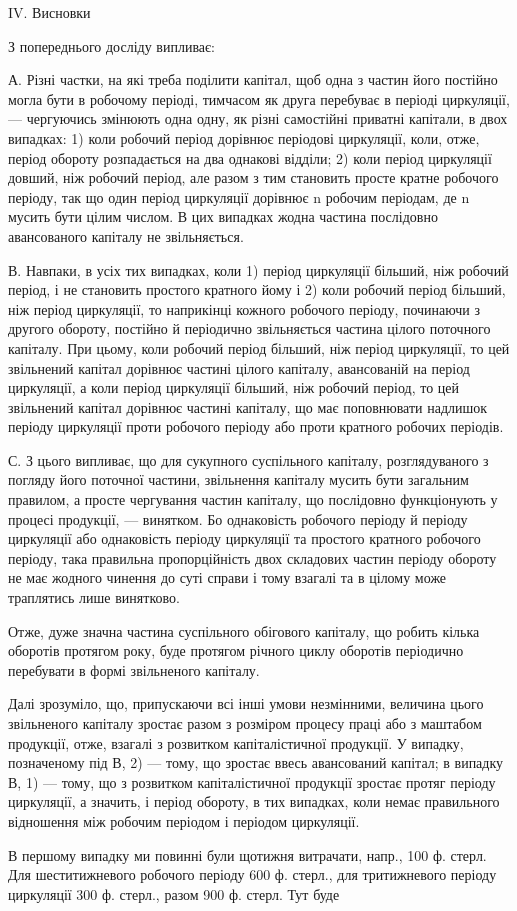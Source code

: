 IV. Висновки

З попереднього досліду випливає:

А. Різні частки, на які треба поділити капітал, щоб одна з частин
його постійно могла бути в робочому періоді, тимчасом як друга перебуває
в періоді циркуляції, — чергуючись змінюють одна одну, як різні
самостійні приватні капітали, в двох випадках: 1) коли робочий період
дорівнює періодові циркуляції, коли, отже, період обороту розпадається
на два однакові відділи; 2) коли період циркуляції довший, ніж робочий
період, але разом з тим становить просте кратне робочого періоду, так
що один період циркуляції дорівнює n робочим періодам, де n мусить
бути цілим числом. В цих випадках жодна частина послідовно авансованого
капіталу не звільняється.

В. Навпаки, в усіх тих випадках, коли 1) період циркуляції більший,
ніж робочий період, і не становить простого кратного йому і 2) коли
робочий період більший, ніж період циркуляції, то наприкінці кожного
робочого періоду, починаючи з другого обороту, постійно й періодично
звільняється частина цілого поточного капіталу. При цьому, коли робочий
період більший, ніж період циркуляції, то цей звільнений капітал
дорівнює частині цілого капіталу, авансованій на період циркуляції, а
коли період циркуляції більший, ніж робочий період, то цей звільнений
капітал дорівнює частині капіталу, що має поповнювати надлишок періоду
циркуляції проти робочого періоду або проти кратного робочих періодів.

С. З цього випливає, що для сукупного суспільного капіталу, розглядуваного
з погляду його поточної частини, звільнення капіталу
мусить бути загальним правилом, а просте чергування частин капіталу,
що послідовно функціонують у процесі продукції, — винятком. Бо однаковість
робочого періоду й періоду циркуляції або однаковість періоду
циркуляції та простого кратного робочого періоду, така правильна пропорційність
двох складових частин періоду обороту не має жодного
чинення до суті справи і тому взагалі та в цілому може траплятись лише
винятково.

Отже, дуже значна частина суспільного обігового капіталу, що робить
кілька оборотів протягом року, буде протягом річного циклу оборотів
періодично перебувати в формі звільненого капіталу.

Далі зрозуміло, що, припускаючи всі інші умови незмінними, величина
цього звільненого капіталу зростає разом з розміром процесу праці
або з маштабом продукції, отже, взагалі з розвитком капіталістичної
продукції. У випадку, позначеному під В, 2) — тому, що зростає ввесь
авансований капітал; в випадку В, 1) — тому, що з розвитком капіталістичної
продукції зростає протяг періоду циркуляції, а значить, і період
обороту, в тих випадках, коли немає правильного відношення між робочим
періодом і періодом циркуляції.

В першому випадку ми повинні були щотижня витрачати, напр.,
100 ф. стерл. Для шеститижневого робочого періоду 600 ф. стерл., для тритижневого
періоду циркуляції 300 ф. стерл., разом 900 ф. стерл. Тут буде
